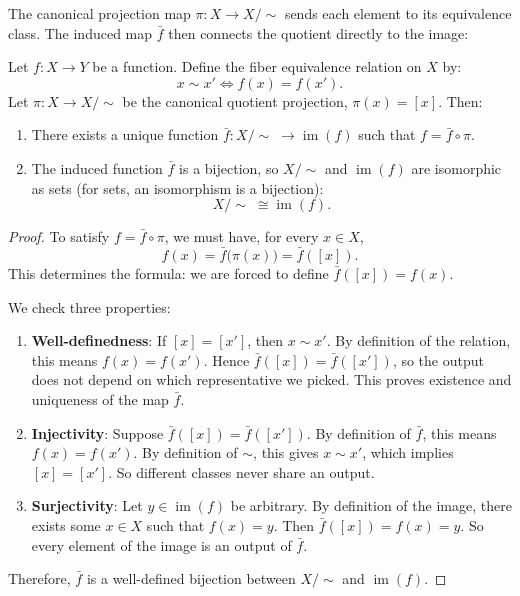 The canonical projection map $\pi: X \to X/\!\sim$ sends each element to its equivalence class. The induced map $\bar{f}$ then connects the quotient directly to the image:

\begin{theorem}
Let $f: X \to Y$ be a function. Define the fiber equivalence relation on $X$ by:
\[
x \sim x' \iff f(x) = f(x').
\]
Let $\pi: X \to X/\!\sim$ be the canonical quotient projection, $\pi(x) = [x]$. Then:
\begin{enumerate}
  \item There exists a unique function $\bar{f}: X/\!\sim\; \to \operatorname{im}(f)$ such that $f = \bar{f} \circ \pi$.
  \item The induced function $\bar{f}$ is a bijection, so $X/\!\sim$ and $\operatorname{im}(f)$ are isomorphic as sets (for sets, an isomorphism is a bijection):
  \[
  X/\!\sim\; \cong \operatorname{im}(f).
  \]
\end{enumerate}
\end{theorem}

\begin{proof}
To satisfy $f = \bar{f} \circ \pi$, we must have, for every $x \in X$,
\[
f(x) = \bar{f}\bigl(\pi(x)\bigr) = \bar{f}([x]).
\]
This determines the formula: we are forced to define $\bar{f}([x]) = f(x)$.

We check three properties:
\begin{enumerate}
  \item \textbf{Well-definedness}: If $[x] = [x']$, then $x \sim x'$. By definition of the relation, this means $f(x) = f(x')$. Hence $\bar{f}([x]) = \bar{f}([x'])$, so the output does not depend on which representative we picked. This proves existence and uniqueness of the map $\bar{f}$.
  \item \textbf{Injectivity}: Suppose $\bar{f}([x]) = \bar{f}([x'])$. By definition of $\bar{f}$, this means $f(x) = f(x')$. By definition of $\sim$, this gives $x \sim x'$, which implies $[x] = [x']$. So different classes never share an output.
  \item \textbf{Surjectivity}: Let $y \in \operatorname{im}(f)$ be arbitrary. By definition of the image, there exists some $x \in X$ such that $f(x) = y$. Then $\bar{f}([x]) = f(x) = y$. So every element of the image is an output of $\bar{f}$.
\end{enumerate}
Therefore, $\bar{f}$ is a well-defined bijection between $X/\!\sim$ and $\operatorname{im}(f)$.
\end{proof}

